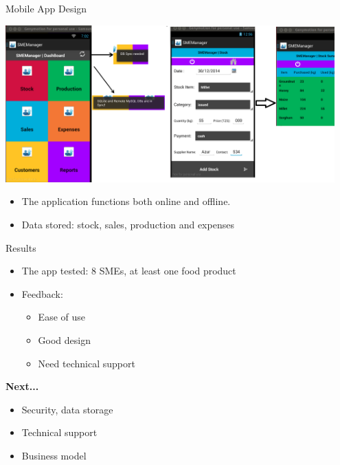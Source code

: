 \documentclass{beamer}
\begin{document}
\begin{frame}{Mobile App Design}
	 	\begin{center}
	     \includegraphics[width=0.95\textwidth]{figs/smeManager}
	     \end{center}
	\begin{itemize}
	    \item The application functions both online and offline.
	     \item Data stored: stock, sales, production and expenses
	     \end{itemize}
	    
\end{frame}

\begin{frame}{Results}
		\begin{itemize}
	    \item The app tested: 8 SMEs, at least one food product
		\item Feedback:
	\begin{itemize}
	    \item Ease of use
		\item Good design 
		\item Need technical support
		\end{itemize}
	\end{itemize}

\large{\textbf {Next...}}
	\begin{itemize}
	\item Security, data storage
	\item Technical support 
	\item Business model
	     \end{itemize}
	
\end{frame}
\end{document}
